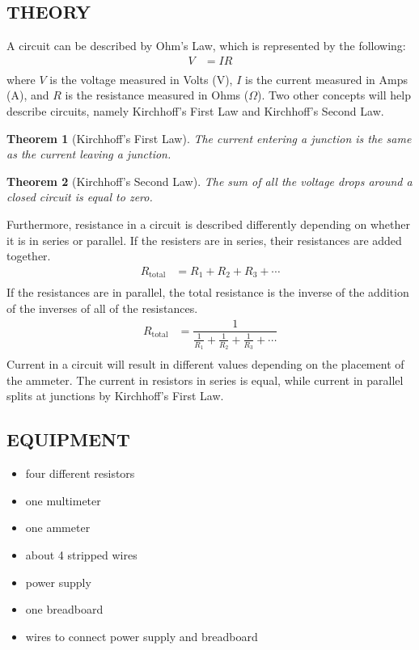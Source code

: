 \documentclass [12pt, letterpaper, twoside] {article}
\newtheorem{theorem}{Theorem}
\begin{document}
\subsection* {THEORY}
\noindent
A circuit can be described by Ohm's Law, which is represented by the following:
\begin{equation}
  \begin{split}
    V &= IR \\
  \end{split}
\end{equation}
where \(V\) is the voltage measured in Volts (V), \(I\) is the current measured in Amps (A), and \(R\) is the resistance measured in Ohms (\(\Omega\)). Two other concepts will help describe circuits, namely Kirchhoff's First Law and Kirchhoff's Second Law.
\begin{theorem}[Kirchhoff's First Law]
  The current entering a junction is the same as the current leaving a junction.
\end{theorem}
\begin{theorem}[Kirchhoff's Second Law]
  The sum of all the voltage drops around a closed circuit is equal to zero.
\end{theorem}
Furthermore, resistance in a circuit is described differently depending on whether it is in series or parallel. If the resisters are in series, their resistances are added together.
\begin{equation}
  \begin{split}
    R_{\text{total}} &= R_{1} + R_{2} + R_{3} + \cdots \\
  \end{split}
\end{equation}
If the resistances are in parallel, the total resistance is the inverse of the addition of the inverses of all of the resistances.
\begin{equation}
  \begin{split}
    R_{\text{total}} &= \dfrac{1}{\tfrac{1}{R_{1}} + \tfrac{1}{R_{2}} + \tfrac{1}{R_{3}} + \cdots} \\
  \end{split}
\end{equation}
Current in a circuit will result in different values depending on the placement of the ammeter. The current in resistors in series is equal, while current in parallel splits at junctions by Kirchhoff's First Law. 

\subsection* {EQUIPMENT}
  \noindent
  \begin {itemize}
    \itemsep0em
    \item {four different resistors}
    \item {one multimeter}
    \item {one ammeter}
    \item {about 4 stripped wires}
    \item {power supply}
    \item {one breadboard}
    \item {wires to connect power supply and breadboard}
  \end {itemize}
\end{document}

